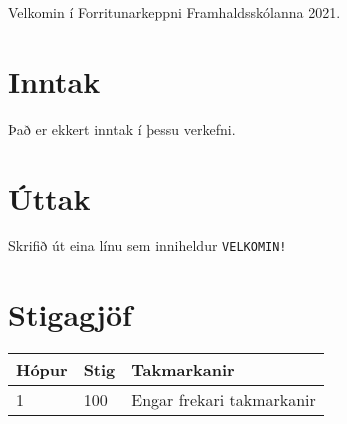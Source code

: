 
Velkomin í Forritunarkeppni Framhaldsskólanna 2021.

\section*{Inntak}
Það er ekkert inntak í þessu verkefni.

\section*{Úttak}
Skrifið út eina línu sem inniheldur \texttt{VELKOMIN!}


\section*{Stigagjöf}
\begin{tabular}{|l|l|l|}
\hline
Hópur & Stig & Takmarkanir \\ \hline
1     & 100  & Engar frekari takmarkanir \\ \hline
\end{tabular}

